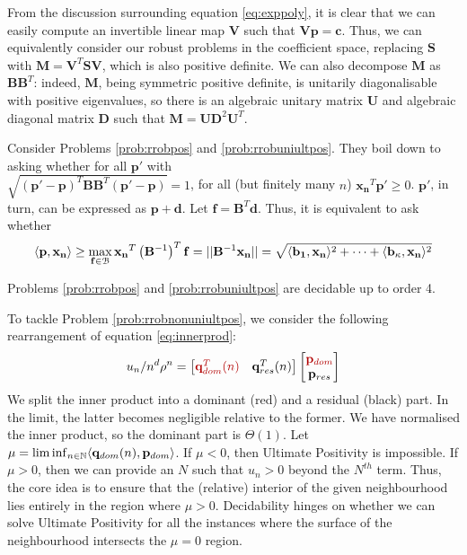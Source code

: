 From the discussion surrounding equation \ref{eq:exppoly}, it is clear that we can easily compute an invertible linear map $\mathbf{V}$ such that $\mathbf{Vp} = \mathbf{c}$. Thus, we can equivalently consider our robust problems in the coefficient space, replacing $\mathbf{S}$ with $\mathbf{M} = \mathbf{V}^T\mathbf{SV}$, which is also positive definite. We can also decompose $\mathbf{M}$ as $\mathbf{B}\mathbf{B}^T$: indeed, $\mathbf{M}$, being symmetric positive definite, is unitarily diagonalisable with positive eigenvalues, so there is an algebraic unitary matrix $\mathbf{U}$ and algebraic diagonal matrix $\mathbf{D}$ such that $\mathbf{M} = \mathbf{U}\mathbf{D}^2\mathbf{U}^T$.

Consider Problems \ref{prob:rrobpos} and \ref{prob:rrobuniultpos}. They boil down to asking whether for all $\mathbf{p'}$ with\\ 
$\sqrt{(\mathbf{p'}-\mathbf{p})^T\mathbf{BB}^T(\mathbf{p'} - \mathbf{p})} = 1$, for all (but finitely many $n$) $\mathbf{x_n}^T\mathbf{p'} \ge 0$. $\mathbf{p'}$, in turn, can be expressed as $\mathbf{p} + \mathbf{d}$. Let $\mathbf{f} = \mathbf{B}^T\mathbf{d}$. Thus, it is equivalent to ask whether
\begin{equation}
\label{eq:crux}
\langle\mathbf{p}, \mathbf{x_n}\rangle \ge \max_{\mathbf{f} \in \mathcal{B}}\mathbf{x_n}^T\left(\mathbf{B}^{-1}\right)^T\mathbf{f} = ||\mathbf{B}^{-1}\mathbf{x_n}|| = \sqrt{\langle\mathbf{b_1}, \mathbf{x_n}\rangle^2 +\dots+\langle\mathbf{b_\kappa}, \mathbf{x_n}\rangle^2}
\end{equation}

\begin{theorem}
\label{thm:decide}
Problems \ref{prob:rrobpos} and \ref{prob:rrobuniultpos} are decidable up to order 4.
\end{theorem}

To tackle Problem \ref{prob:rrobnonuniultpos}, we consider the following rearrangement of equation \ref{eq:innerprod}:
\begin{equation}
\label{eq:grouping}
u_n/n^d\rho^n = \begin{bmatrix}
{\color{red!70!black} \mathbf{q}_{dom}^T(n) } & \mathbf{q}_{res}^T(n)
\end{bmatrix}
\begin{bmatrix}
{\color{red!70!black} \mathbf{p}_{dom}} \\
\mathbf{p}_{res}
\end{bmatrix}
\end{equation}
We split the inner product into a dominant ({\color{red!70!black}red}) and a residual (black) part. In the limit, the latter becomes negligible relative to the former. We have normalised the inner product, so the dominant part is $\Theta(1)$. Let $\mu = \liminf_{n\in \mathbb{N}}\langle \mathbf{q}_{dom}(n), \mathbf{p}_{dom}\rangle$. If $\mu < 0$, then Ultimate Positivity is impossible. If $\mu > 0$, then we can provide an $N$ such that $u_n > 0$ beyond the $N^{th}$ term. Thus, the core idea is to ensure that the (relative) interior of the given neighbourhood lies entirely in the region where $\mu > 0$. Decidability hinges on whether we can solve Ultimate Positivity for all the instances where the surface of the neighbourhood intersects the $\mu = 0$ region.

